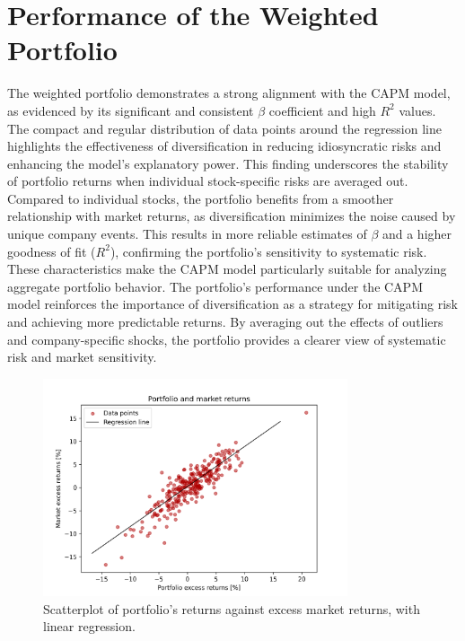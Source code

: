 \section{Performance of the Weighted Portfolio}
The weighted portfolio demonstrates a strong alignment with the CAPM model, as evidenced by its significant and consistent
$\beta$ coefficient and high $R^2$ values. 
The compact and regular distribution of data points around the regression line highlights the effectiveness of diversification 
in reducing idiosyncratic risks and enhancing the model's explanatory power. 
This finding underscores the stability of portfolio returns when individual stock-specific risks are averaged out.
Compared to individual stocks, the portfolio benefits from a smoother relationship with market returns, as diversification 
minimizes the noise caused by unique company events. This results in more reliable estimates of $\beta$ and a higher goodness 
of fit ($R^2$), confirming the portfolio's sensitivity to systematic risk.
These characteristics make the CAPM model particularly suitable for analyzing aggregate portfolio behavior.
The portfolio's performance under the CAPM model reinforces the importance of diversification as a strategy for mitigating
risk and achieving more predictable returns. 
By averaging out the effects of outliers and company-specific shocks, the portfolio provides a clearer view of systematic 
risk and market sensitivity.

\begin{figure}[h]
    \centering
    \includegraphics[width=0.8\textwidth]{images/portfolio_regression.png}
    \caption{Scatterplot of portfolio's returns against excess market returns, with linear regression.}\label{fig:portfolio_regression}
\end{figure}

